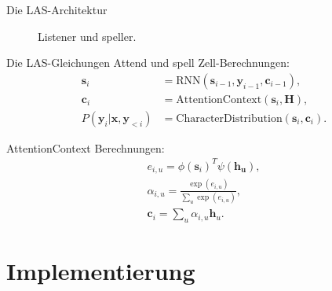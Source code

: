 \documentclass[10pt]{beamer}
\begin{document}
\begin{frame}{Die LAS-Architektur}
	\begin{figure}
		\caption{Listener und speller.}
	\end{figure}
\end{frame}

\begin{frame}{Die LAS-Gleichungen}
Attend und spell Zell-Berechnungen:
\begin{align}
	 \mathbf{s}_i &= \text{RNN}(\mathbf{s}_{i-1}, \mathbf{y}_{i-1}, \mathbf{c}_{i-1}), \\
	 \mathbf{c}_i &= \text{AttentionContext}(\mathbf{s}_i,\mathbf{H}), \\
	  P(\mathbf{y}_i|\mathbf{x}, \mathbf{y}_{<i}) &= \text{CharacterDistribution}(\mathbf{s}_i,\textbf{c}_i).
\end{align}

AttentionContext Berechnungen:
\begin{align}
	e_{i,u} = \phi(\mathbf{s}_i)^T \psi(\mathbf{h_u}), \\
	\alpha_{i,u} = \frac{ \exp(e_{i,u})}{ \sum\limits_{u} \exp(e_{i,u})}, \\
	\label{eq:alphas}
	\mathbf{c}_i = \sum\limits_{u} \alpha_{i,u} \mathbf{h}_u.
\end{align}
\end{frame}

\section{Implementierung}
\end{document}

